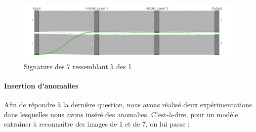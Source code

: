 \documentclass[oneside,13pt,a4paper]{report}
\begin{document}
\begin{figure}[!h]
\begin{center}
\includegraphics[width=1.0\textwidth]{img/sankey_7.png}
\end{center}
\caption{Signature des 7 ressemblant à des 1}
\label{sankey71}
\end{figure}

\paragraph{Insertion d'anomalies}

Afin de répondre à la dernière question, nous avons réalisé deux expérimentations dans lesquelles nous avons inséré des anomalies. C'est-à-dire, pour un modèle entraîner à reconnaître des images de 1 et de 7, on lui passe :
\end{document}
